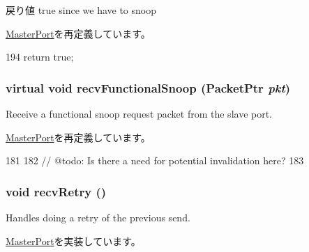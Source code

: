 \begin{DoxyReturn}{戻り値}
true since we have to snoop 
\end{DoxyReturn}


\hyperlink{classMasterPort_a32602a6a3c3d66a639455036d6c08dd6}{MasterPort}を再定義しています。


\begin{DoxyCode}
194 { return true; }
\end{DoxyCode}
\hypertarget{classFullO3CPU_1_1DcachePort_af5b15bc08781cf0ba6190efc37d5b67e}{
\subsubsection[{recvFunctionalSnoop}]{\setlength{\rightskip}{0pt plus 5cm}virtual void recvFunctionalSnoop ({\bf PacketPtr} {\em pkt})}}
\label{classFullO3CPU_1_1DcachePort_af5b15bc08781cf0ba6190efc37d5b67e}
Receive a functional snoop request packet from the slave port. 

\hyperlink{classMasterPort_af5b15bc08781cf0ba6190efc37d5b67e}{MasterPort}を再定義しています。


\begin{DoxyCode}
181         {
182             // @todo: Is there a need for potential invalidation here?
183         }
\end{DoxyCode}
\hypertarget{classFullO3CPU_1_1DcachePort_a29cb5a4f98063ce6e9210eacbdb35298}{
\subsubsection[{recvRetry}]{\setlength{\rightskip}{0pt plus 5cm}void recvRetry ()}}
\label{classFullO3CPU_1_1DcachePort_a29cb5a4f98063ce6e9210eacbdb35298}
Handles doing a retry of the previous send. 

\hyperlink{classMasterPort_ac1ccc3bcf7ebabb20b57fab99b2be5b0}{MasterPort}を実装しています。


